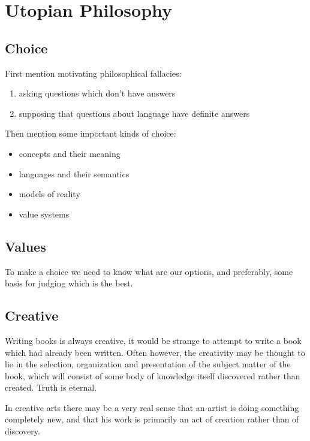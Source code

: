 \chapter{Utopian Philosophy}\label{UtopianPhilosophy}


\section{Choice}

First mention motivating philosophical fallacies:
\begin{enumerate}
\item asking questions which don't have answers
\item supposing that questions about language have definite answers
\end{enumerate}

Then mention some important kinds of choice:

\begin{itemize}
\item concepts and their meaning
\item languages and their semantics
\item models of reality
\item value systems
\end{itemize}

\section{Values}

To make a choice we need to know what are our options, and preferably, some basis for judging which is the best.

\section{Creative}

Writing books is always creative, it would be strange to attempt to write a book which had already been written.
Often however, the creativity may be thought to lie in the selection, organization and presentation of the subject matter of the book, which will consist of some body of knowledge itself discovered rather than created.
Truth is eternal.

In creative arts there may be a very real sense that an artist is doing something completely new, and that his work is primarily an act of creation rather than of discovery.

